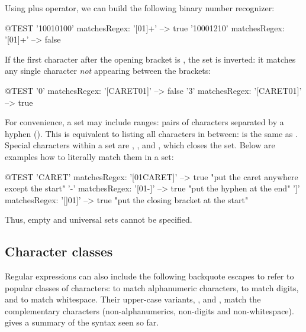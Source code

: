 \documentclass[a4paper,10pt,twoside]{book}
\begin{document}
{Using plus operator, we can build the following binary number recognizer:
\begin{code}{@TEST}
'10010100' matchesRegex: '[01]+' --> true
'10001210' matchesRegex: '[01]+' --> false
\end{code}

If the first character after the opening bracket is , the set is inverted: it matches any single character \emph{not} appearing between the brackets:
\begin{code}{@TEST}
'0' matchesRegex: '[CARET01]' --> false
'3' matchesRegex: '[CARET01]' --> true
\end{code}

For convenience, a set may include ranges: pairs of characters separated by a hyphen (\ct{-}). This is equivalent to listing all characters in between:  is the same as .
Special characters within a set are , \ct{-}, and \ct{]}, which closes the set. Below are examples how to literally match them in a set:
\begin{code}{@TEST}
'CARET' matchesRegex: '[01CARET]'   --> true    "put the caret anywhere except the start"
'-' matchesRegex: '[01-]' --> true    "put the hyphen at the end"
']' matchesRegex: '[]01]'   --> true    "put the closing bracket at the start"
\end{code}

Thus, empty and universal sets cannot be specified.

\subsection{Character classes}
Regular expressions can also include the following backquote escapes to refer to popular classes of characters: \ct{\w} to match alphanumeric characters, \ct{\d} to match digits, and \ct{\s} to match whitespace.
Their upper-case variants, \ct{\W}, \ct{\D} and \ct{\S}, match the complementary characters (non-alphanumerics, non-digits and non-whitespace).
 gives a summary of the syntax seen so far.

}
\end{document}
